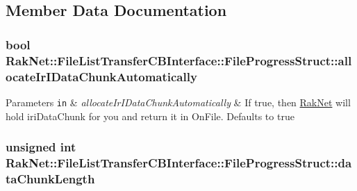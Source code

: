 \subsection{Member Data Documentation}
\hypertarget{struct_rak_net_1_1_file_list_transfer_c_b_interface_1_1_file_progress_struct_abb68fe1d7bc9fcf53d687ade569001e5}{
\subsubsection[{allocate\-Ir\-I\-Data\-Chunk\-Automatically}]{\setlength{\rightskip}{0pt plus 5cm}bool Rak\-Net\-::\-File\-List\-Transfer\-C\-B\-Interface\-::\-File\-Progress\-Struct\-::allocate\-Ir\-I\-Data\-Chunk\-Automatically}}\label{struct_rak_net_1_1_file_list_transfer_c_b_interface_1_1_file_progress_struct_abb68fe1d7bc9fcf53d687ade569001e5}

\begin{DoxyParams}[1]{Parameters}
\mbox{\tt in}  & {\em allocate\-Ir\-I\-Data\-Chunk\-Automatically} & If true, then \hyperlink{namespace_rak_net}{Rak\-Net} will hold iri\-Data\-Chunk for you and return it in On\-File. Defaults to true \\
\hline
\end{DoxyParams}
\hypertarget{struct_rak_net_1_1_file_list_transfer_c_b_interface_1_1_file_progress_struct_ac7a15b6dfecf64a648b655577231f22b}{
\subsubsection[{data\-Chunk\-Length}]{\setlength{\rightskip}{0pt plus 5cm}unsigned int Rak\-Net\-::\-File\-List\-Transfer\-C\-B\-Interface\-::\-File\-Progress\-Struct\-::data\-Chunk\-Length}}\label{struct_rak_net_1_1_file_list_transfer_c_b_interface_1_1_file_progress_struct_ac7a15b6dfecf64a648b655577231f22b}

